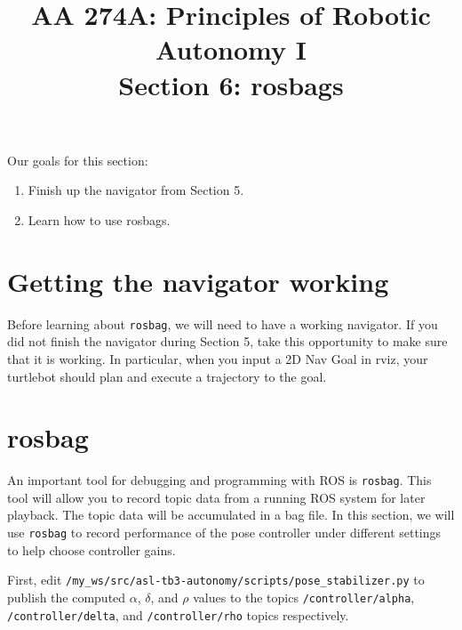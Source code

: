 \documentclass{article}
\title{AA 274A: Principles of Robotic Autonomy I \\Section 6: rosbags}
\date{}
\begin{document}
\maketitle
\pagestyle{fancy}
\vspace{-1.25cm}
Our goals for this section: 
\begin{enumerate}
    \item Finish up the navigator from Section 5.
    \item Learn how to use rosbags.
\end{enumerate}


\section{Getting the navigator working}
Before learning about \texttt{rosbag}, we will need to have a working navigator. If you did not finish the navigator during Section 5, take this opportunity to make sure that it is working. In particular, when you input a 2D Nav Goal in rviz, your turtlebot should plan and execute a trajectory to the goal.

\section{rosbag}
An important tool for debugging and programming with ROS is \texttt{rosbag}. This tool will allow you to record topic data from a running ROS system for later playback. The topic data will be accumulated in a bag file. In this section, we will use \texttt{rosbag} to record performance of the pose controller under different settings to help choose controller gains.

First, edit 
\texttt{/my\_ws/src/asl-tb3-autonomy/scripts/pose\_stabilizer.py}
to publish the computed $\alpha$, $\delta$, and $\rho$ values to the topics \texttt{/controller/alpha}, \texttt{/controller/delta}, and \texttt{/controller/rho} topics respectively. 
\end{document}
